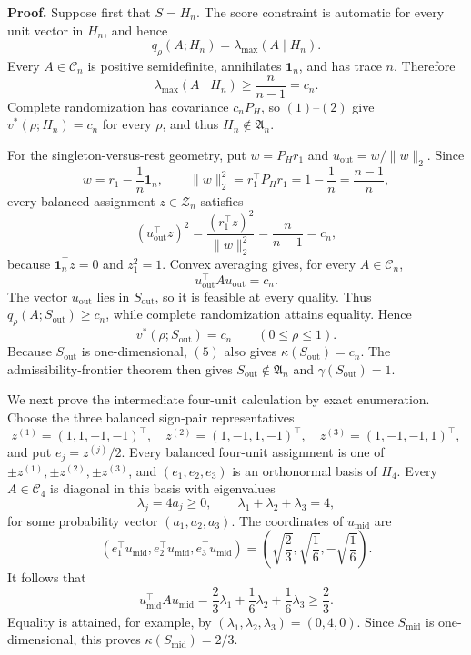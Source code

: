 \textbf{Proof.}
Suppose first that \(S=H_n\).  The score constraint is automatic for every unit vector in \(H_n\), and hence
\[
q_\rho(A;H_n)=\lambda_{\max}(A\mid H_n).
\tag{1}
\]
Every \(A\in\mathcal C_n\) is positive semidefinite, annihilates \(\mathbf1_n\), and has trace \(n\).  Therefore
\[
\lambda_{\max}(A\mid H_n)\geq\frac{n}{n-1}=c_n.
\tag{2}
\]
Complete randomization has covariance \(c_nP_H\), so \((1)\)--\((2)\) give \(v^*(\rho;H_n)=c_n\) for every \(\rho\), and thus \(H_n\notin\mathfrak A_n\).

For the singleton-versus-rest geometry, put \(w=P_Hr_1\) and \(u_{\mathrm{out}}=w/\|w\|_2\).  Since
\[
w=r_1-\frac1n\mathbf1_n,
\qquad
\|w\|_2^2=r_1^\top P_Hr_1=1-\frac1n=\frac{n-1}{n},
\tag{3}
\]
every balanced assignment \(z\in\mathcal Z_n\) satisfies
\[
(u_{\mathrm{out}}^\top z)^2
=\frac{(r_1^\top z)^2}{\|w\|_2^2}
=\frac{n}{n-1}=c_n,
\tag{4}
\]
because \(\mathbf1_n^\top z=0\) and \(z_1^2=1\).  Convex averaging gives, for every \(A\in\mathcal C_n\),
\[
u_{\mathrm{out}}^\top Au_{\mathrm{out}}=c_n.
\tag{5}
\]
The vector \(u_{\mathrm{out}}\) lies in \(S_{\mathrm{out}}\), so it is feasible at every quality.  Thus \(q_\rho(A;S_{\mathrm{out}})\geq c_n\), while complete randomization attains equality.  Hence
\[
v^*(\rho;S_{\mathrm{out}})=c_n
\qquad(0\leq\rho\leq1).
\tag{6}
\]
Because \(S_{\mathrm{out}}\) is one-dimensional, \((5)\) also gives \(\kappa(S_{\mathrm{out}})=c_n\).  The admissibility-frontier theorem then gives \(S_{\mathrm{out}}\notin\mathfrak A_n\) and \(\gamma(S_{\mathrm{out}})=1\).

We next prove the intermediate four-unit calculation by exact enumeration.  Choose the three balanced sign-pair representatives
\[
z^{(1)}=(1,1,-1,-1)^\top,
\quad
z^{(2)}=(1,-1,1,-1)^\top,
\quad
z^{(3)}=(1,-1,-1,1)^\top,
\tag{7}
\]
and put \(e_j=z^{(j)}/2\).  Every balanced four-unit assignment is one of \(\pm z^{(1)},\pm z^{(2)},\pm z^{(3)}\), and \((e_1,e_2,e_3)\) is an orthonormal basis of \(H_4\).  Every \(A\in\mathcal C_4\) is diagonal in this basis with eigenvalues
\[
\lambda_j=4a_j\geq0,
\qquad
\lambda_1+\lambda_2+\lambda_3=4,
\tag{8}
\]
for some probability vector \((a_1,a_2,a_3)\).  The coordinates of \(u_{\mathrm{mid}}\) are
\[
(e_1^\top u_{\mathrm{mid}},e_2^\top u_{\mathrm{mid}},e_3^\top u_{\mathrm{mid}})
=\left(\sqrt{\frac23},\sqrt{\frac16},-\sqrt{\frac16}\right).
\tag{9}
\]
It follows that
\[
u_{\mathrm{mid}}^\top Au_{\mathrm{mid}}
=\frac23\lambda_1+\frac16\lambda_2+\frac16\lambda_3
\geq\frac23.
\tag{10}
\]
Equality is attained, for example, by \((\lambda_1,\lambda_2,\lambda_3)=(0,4,0)\).  Since \(S_{\mathrm{mid}}\) is one-dimensional, this proves \(\kappa(S_{\mathrm{mid}})=2/3\).

